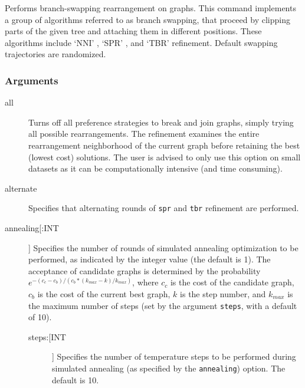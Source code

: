 	\begin{phygdescription}
		{Performs branch-swapping rearrangement on graphs. This command implements a 
		group of algorithms referred to as branch swapping, that proceed by clipping
		parts of the given tree and attaching them in different positions. These algorithms 
		include `NNI' \citep{CaminandSokal1965, Robinson1971}, `SPR' \citep{Dayhoff1969}, 
		and `TBR' \citep{Farris1988, swofford1990a} refinement.  Default swapping trajectories 
		are randomized.}
	\end{phygdescription}
		
	\subsubsection{Arguments}
	\begin{description}
	
		\item[all] Turns off all preference strategies to break and join graphs, simply trying all 
		possible rearrangements. The refinement examines the entire rearrangement neighborhood 
		of the current graph before retaining the best (lowest cost) solutions. The user is advised to
		only use this option on small datasets as it can be computationally intensive (and 
		time consuming).

		\item[alternate] Specifies that alternating rounds of \texttt{spr} \citep{Dayhoff1969} 
		and \texttt{tbr} \citep{Farris1988, swofford1990a} refinement are performed.
		
		\item[annealing[:INT]] Specifies the number of rounds of simulated annealing 
		\citep{Metropolisetal1953,Kirkpatricketal1983,Cerny1985} optimization to be performed, 
		as indicated by the integer value (the default is 1). The acceptance of candidate graphs 
		is determined by the probability $e ^ {- (c_c - c_b)/ (c_b * (k_{max} -k)/ k_{max})}$, 
		where $c_c$ is the cost of the candidate graph, $c_b$ is the cost of the current best 
		graph, $k$ is the step number, and $k_{max}$ is the maximum number of steps (set 
		by the argument \texttt{steps}, with a default of 10).
		
		\begin{description}
			
			\item[steps:[INT]] Specifies the number of temperature steps to be performed during 
			simulated annealing (as specified by the \texttt{annealing}) option. The default is 10.
			

\end{description}
\end{description}

